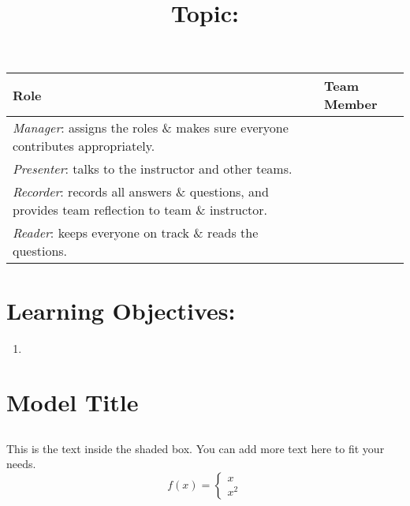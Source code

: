 \documentclass[twoside, 12pt,a4paper]{article}
\title{Topic: \Lesson}
\author{}
\date{}
\begin{document}
\maketitle
\thispagestyle{fancy} %

\begin{center}

    \begin{tabular}{|>{\centering\arraybackslash}p{7cm}|>{\centering\arraybackslash}p{7cm}|}
       \hline
       \Large \textbf{Role}&\Large \textbf{Team Member}\\
       \hline 
       \textit{Manager}: assigns the roles \& makes sure everyone contributes appropriately.  & \\
       \hline 
       \textit{Presenter}: talks to the instructor and other teams. &\\
       \hline
       \textit{Recorder}: records all answers \& questions, and provides team reflection to team \& instructor. &\\
       \hline
       \textit{Reader}: keeps everyone on track \& reads the questions. &\\
       \hline
    \end{tabular}
\end{center}

\section*{\textbf{Learning Objectives:}}
\begin{enumerate}
    \item 
\end{enumerate}
\newpage
\section{Model Title}
\begin{tcolorbox}[colback=black!10, colframe=yellow, title=]
\subsection{}
This is the text inside the shaded box. You can add more text here to fit your needs.
\[f(x)=\begin{cases}
    x\\
    x^2
\end{cases}\]
\end{tcolorbox}
\end{document}
